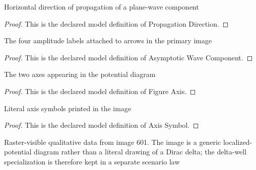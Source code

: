 \begin{definition}
  \label{def:physics:phyx-mini-0601:phyxminiproblems-problemphyxmini0601-propagationdirection}
  Horizontal direction of propagation of a plane-wave component
\end{definition}
\begin{proof}
  This is the declared model definition of Propagation Direction.
\end{proof}
\begin{definition}
  \label{def:physics:phyx-mini-0601:phyxminiproblems-problemphyxmini0601-asymptoticwavecomponent}
  The four amplitude labels attached to arrows in the primary image
\end{definition}
\begin{proof}
  This is the declared model definition of Asymptotic Wave Component.
\end{proof}
\begin{definition}
  \label{def:physics:phyx-mini-0601:phyxminiproblems-problemphyxmini0601-figureaxis}
  The two axes appearing in the potential diagram
\end{definition}
\begin{proof}
  This is the declared model definition of Figure Axis.
\end{proof}
\begin{definition}
  \label{def:physics:phyx-mini-0601:phyxminiproblems-problemphyxmini0601-axissymbol}
  Literal axis symbols printed in the image
\end{definition}
\begin{proof}
  This is the declared model definition of Axis Symbol.
\end{proof}
\begin{definition}
  \label{def:physics:phyx-mini-0601:phyxminiproblems-problemphyxmini0601-scatteringfigure}
  Raster-visible qualitative data from image 601. The image is a generic localized-potential diagram rather than a literal drawing of a Dirac delta; the delta-well specialization is therefore kept in a separate scenario law
\end{definition}
